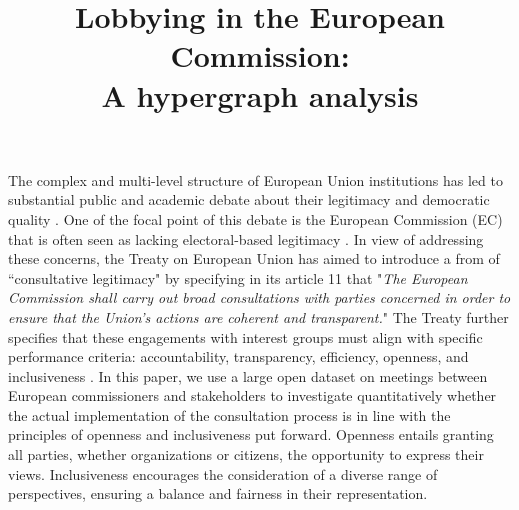 \documentclass[ 11pt]{article}
\title{Lobbying in the European Commission:\\ A hypergraph analysis }
\date{}
\begin{document}
\maketitle

The complex and multi-level structure of European Union institutions has led to substantial public and academic debate about their legitimacy  and democratic quality  \parencite{schmitt1999political,holzhacker2007democratic}. One of the focal point of this debate is the European Commission (EC) that is often seen as lacking electoral-based legitimacy \parencite{drake1997european,tsakatika2005claims,schmidt_europes_2020,thomas_democratic_2009}.
In view of  addressing these concerns, the Treaty on European Union has aimed to introduce a from of ``consultative legitimacy" by specifying in its article 11 that   "\textit{The European Commission shall carry out broad consultations with parties concerned in order to ensure that the Union's actions are coherent and transparent.}"  The Treaty further specifies  that these engagements with interest groups must align with specific performance criteria: accountability, transparency, efficiency, openness, and inclusiveness \parencite{schmidt_europes_2020}.  In this paper, we use a large open dataset on  meetings between European commissioners and stakeholders to investigate quantitatively whether the actual implementation of the consultation process is in line  with the principles of openness and inclusiveness put forward. Openness entails granting all parties, whether organizations or citizens, the opportunity to express their views.  Inclusiveness encourages the consideration of a diverse range of perspectives, ensuring a balance and fairness in their representation.    \\
\end{document}
